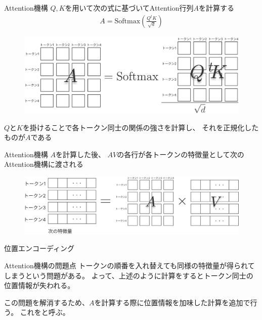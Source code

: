 \documentclass[dvipdfm]{beamer}
\begin{document}
    \begin{frame}{Attention機構}
        $Q, K$を用いて次の式に基づいてAttention行列$A$を計算する
        \begin{align*}
            A = \mathrm{Softmax}\left(\frac{Q^t\!K}{\sqrt{d}}\right)
        \end{align*}

        \begin{figure}
            \centering
            \includegraphics[width=.8\hsize]{attention1.pdf}
        \end{figure}
        $Q$と$K$を掛けることで各トークン同士の関係の強さを計算し、
        それを正規化したものが$A$である
    \end{frame}
    \begin{frame}{Attention機構}
        $A$を計算した後、
        $AV$の各行が各トークンの特徴量として次のAttention機構に渡される

        \begin{figure}
            \centering
            \includegraphics[width=1\hsize]{attention2.pdf}
        \end{figure}
    \end{frame}
    \begin{frame}{位置エンコーディング}
        \begin{block}{Attention機構の問題点}
            トークンの順番を入れ替えても同様の特徴量が得られてしまうという問題がある。
            よって、上述のように計算をするとトークン同士の位置情報が失われる。
        \end{block}
        
        この問題を解消するため、$A$を計算する際に位置情報を加味した計算を追加で行う。
        これをと呼ぶ。
    \end{frame}
\end{document}
